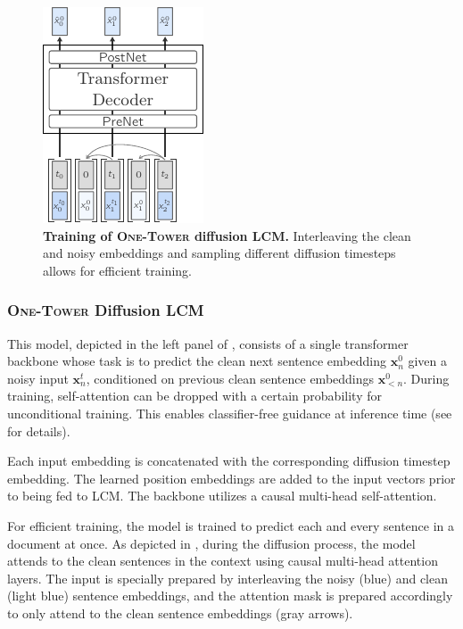 \documentclass[twoside,11pt]{fairmeta}
\newcommand{\lcm}{\textsc{LCM}\xspace}
\newcommand{\interleaved}{\textsc{One-Tower}\xspace}
\newcommand{\diffx}[2]{\rvx^{#1}_{#2}}
\def\rvx{{\mathbf{x}}}
\begin{document}
\begin{figure}[!htbp]
    \centering
    \includegraphics[width=.25\linewidth]{interleaved_training.pdf}
    \caption{\textbf{Training of \interleaved diffusion \lcm.} Interleaving the clean and noisy embeddings and sampling different diffusion timesteps allows for efficient training.
    }
    \label{fig:archi:interleaved_training}
\end{figure}

\subsubsection{\interleaved Diffusion \lcm}
\label{sec:arch:interleaved}

This model, depicted in the left panel of , consists of a single transformer backbone whose task is to predict the clean next sentence embedding $\diffx{0}{n}$ given a noisy input $\diffx{t}{n}$, conditioned on previous clean sentence embeddings $\diffx{0}{<n}$.
During training, self-attention can be dropped with a certain probability
for unconditional training. 
This enables classifier-free guidance at inference time (see  for details).

Each input embedding is concatenated with the corresponding diffusion timestep embedding. 
The learned position embeddings are added to the input vectors prior to being fed to \lcm.
The backbone utilizes a causal multi-head self-attention.

For efficient training, the model is trained to predict each and every sentence in a document at once.
As depicted in , during the diffusion process, the model attends to the clean sentences in the context using causal multi-head attention layers.
The input is specially prepared by interleaving the noisy (blue) and clean (light blue) sentence embeddings, and the attention mask is prepared accordingly to only attend to the clean sentence embeddings (gray arrows).
\end{document}
